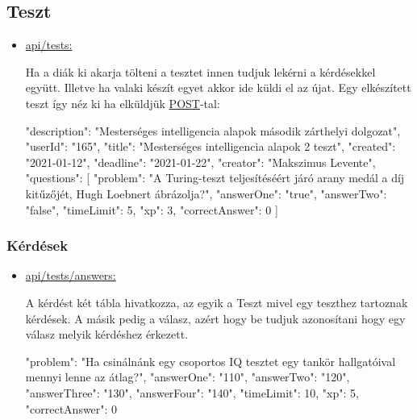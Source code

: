 \subsection{Teszt}
\begin{itemize}[label={$\bullet$}, topsep=0pt, itemsep=0pt, leftmargin=15pt]
    \item[] {\url{api/tests:}}
          \begin{addmargin}[\parindent]{0pt}
              Ha a diák ki akarja tölteni a tesztet innen tudjuk lekérni a kérdésekkel együtt. Illetve ha valaki készít egyet akkor ide küldi el az újat.
              Egy elkészített teszt így néz ki ha elküldjük \url{POST}-tal:
              \begin{json}
                  {
                  "description": "Mesterséges intelligencia alapok második zárthelyi dolgozat",
                  "userId": "165",
                  "title": "Mesterséges intelligencia alapok 2 teszt",
                  "created": "2021-01-12",
                  "deadline": "2021-01-22",
                  "creator": "Makszimus Levente",
                  "questions": [
                  {
                          "problem": "A Turing-teszt teljesítéséért járó arany medál a díj kitűzőjét, Hugh Loebnert ábrázolja?",
                          "answerOne": "true",
                          "answerTwo": "false",
                          "timeLimit": 5,
                          "xp": 3,
                          "correctAnswer": 0
                      }
                  ]
                  }
              \end{json}
          \end{addmargin}
\end{itemize}

\subsubsection{Kérdések}
\begin{itemize}[label={$\bullet$}, topsep=0pt, itemsep=0pt, leftmargin=15pt]
    \item[] {\url{api/tests/answers:}}
          \begin{addmargin}[\parindent]{0pt}
              A kérdést két tábla hivatkozza, az egyik a Teszt mivel egy teszthez tartoznak kérdések. A másik pedig a válasz, azért hogy be tudjuk azonosítani hogy egy válasz melyik kérdéshez érkezett.
              \begin{json}
                  {
                      "problem": "Ha csinálnánk egy csoportos IQ tesztet egy tankör hallgatóival mennyi lenne az átlag?",
                      "answerOne": "110",
                      "answerTwo": "120",
                      "answerThree": "130",
                      "answerFour": "140",
                      "timeLimit": 10,
                      "xp": 5,
                      "correctAnswer": 0
                  }
              \end{json}
          \end{addmargin}
\end{itemize}

